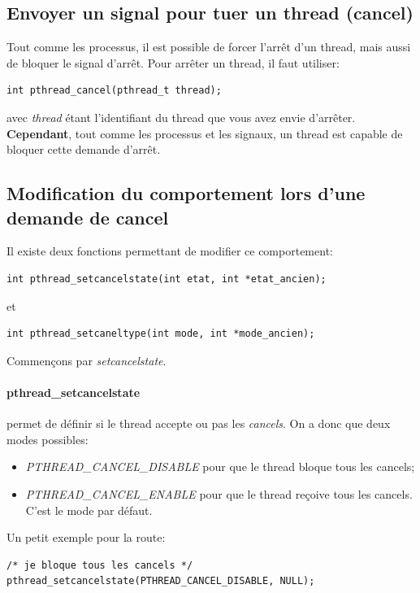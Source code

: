 \documentclass{report}
\begin{document}
\subsection{Envoyer un signal pour tuer un thread (cancel)}
Tout comme les processus, il est possible de forcer l'arrêt d'un thread, mais aussi de bloquer le signal d'arrêt.
Pour arrêter un thread, il faut utiliser:
\begin{verbatim}
int pthread_cancel(pthread_t thread);
\end{verbatim}
avec \emph{thread} étant l'identifiant du thread que vous avez envie d'arrêter. \textbf{Cependant}, tout comme les processus et les signaux, un thread est capable de bloquer cette demande d'arrêt.

\subsection{Modification du comportement lors d'une demande de cancel}
Il existe deux fonctions permettant de modifier ce comportement:
\begin{verbatim}
int pthread_setcancelstate(int etat, int *etat_ancien);
\end{verbatim}
et
\begin{verbatim}
int pthread_setcaneltype(int mode, int *mode_ancien);
\end{verbatim}
Commençons par \emph{setcancelstate}.

\paragraph{pthread\_setcancelstate} permet de définir si le thread accepte ou pas les \emph{cancels}. On a donc que deux modes possibles:
\begin{itemize}
\item{\emph{PTHREAD\_CANCEL\_DISABLE} pour que le thread bloque tous les cancels;}
\item{\emph{PTHREAD\_CANCEL\_ENABLE} pour que le thread reçoive tous les cancels. C'est le mode par défaut.}
\end{itemize}

Un petit exemple pour la route:
\begin{verbatim}
/* je bloque tous les cancels */
pthread_setcancelstate(PTHREAD_CANCEL_DISABLE, NULL);
\end{verbatim}
\end{document}
